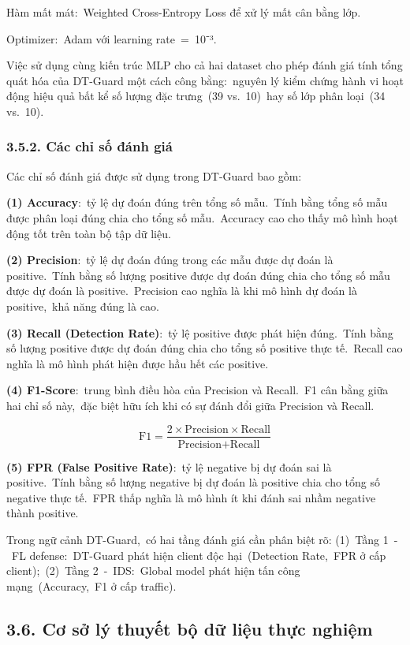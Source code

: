 Hàm mất mát:~Weighted Cross-Entropy Loss để xử lý mất cân bằng lớp.

Optimizer:~Adam với learning rate~=~10⁻³.

Việc sử dụng cùng kiến trúc MLP cho cả hai dataset cho phép đánh giá tính tổng quát hóa của DT-Guard một cách công bằng:~nguyên lý kiểm chứng hành vi hoạt động hiệu quả bất kể số lượng đặc trưng~(39 vs.~10)~hay số lớp phân loại~(34 vs.~10).

\subsubsection{3.5.2. Các chỉ số đánh giá}\label{cuxe1c-chux1ec9-sux1ed1-ux111uxe1nh-giuxe1}

Các chỉ số đánh giá được sử dụng trong DT-Guard bao gồm:

\textbf{(1) Accuracy}:~tỷ lệ dự đoán đúng trên tổng số mẫu.~Tính bằng tổng số mẫu được phân loại đúng chia cho tổng số mẫu.~Accuracy cao cho thấy mô hình hoạt động tốt trên toàn bộ tập dữ liệu.

\textbf{(2) Precision}:~tỷ lệ dự đoán đúng trong các mẫu được dự đoán là positive.~Tính bằng số lượng positive được dự đoán đúng chia cho tổng số mẫu được dự đoán là positive.~Precision cao nghĩa là khi mô hình dự đoán là positive,~khả năng đúng là cao.

\textbf{(3) Recall (Detection Rate)}:~tỷ lệ positive được phát hiện đúng.~Tính bằng số lượng positive được dự đoán đúng chia cho tổng số positive thực tế.~Recall cao nghĩa là mô hình phát hiện được hầu hết các positive.

\textbf{(4) F1-Score}:~trung bình điều hòa của Precision và Recall.~F1 cân bằng giữa hai chỉ số này,~đặc biệt hữu ích khi có sự đánh đổi giữa Precision và Recall.

\[\text{F1} = \frac{2 \times \text{Precision} \times \text{Recall}}{\text{Precision} + \text{Recall}}
\]

\textbf{(5) FPR (False Positive Rate)}:~tỷ lệ negative bị dự đoán sai là positive.~Tính bằng số lượng negative bị dự đoán là positive chia cho tổng số negative thực tế.~FPR thấp nghĩa là mô hình ít khi đánh sai nhầm negative thành positive.

Trong ngữ cảnh DT-Guard,~có hai tầng đánh giá cần phân biệt rõ: (1)~Tầng 1~-~FL defense:~DT-Guard phát hiện client độc hại~(Detection Rate,~FPR ở cấp client);~(2)~Tầng 2~-~IDS:~Global model phát hiện tấn công mạng~(Accuracy,~F1 ở cấp traffic).

\subsection{3.6. Cơ sở lý thuyết bộ dữ liệu thực nghiệm}\label{cux1a1-sux1edf-luxfd-thuyux1ebft-bux1ed9-dux1eef-liux1ec7u-thux1ef1c-nghiux1ec7m}

